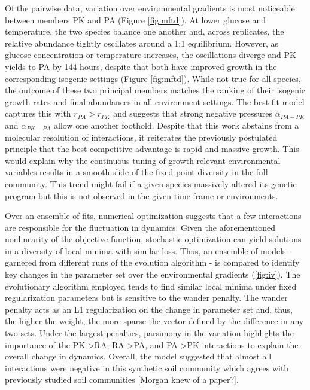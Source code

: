 \documentclass[twocolumn, 10pt]{report}
\begin{document}
{Of the pairwise data, variation over environmental gradients is most noticeable between members PK and PA (Figure \ref{fig:mftd}). At lower glucose and temperature, the two species balance one another and, across replicates, the relative abundance tightly oscillates around a 1:1 equilibrium. However, as glucose concentration or temperature increases, the oscillations diverge and PK yields to PA by 144 hours, despite that both have improved growth in the corresponding isogenic settings (Figure \ref{fig:mftd}). While not true for all species, the outcome of these two principal members matches the ranking of their isogenic growth rates and final abundances in all environment settings. The best-fit model captures this with $r_{PA} > r_{PK}$ and suggests that strong negative pressures $\alpha_{PA-PK}$ and $\alpha_{PK-PA}$ allow one another foothold. Despite that this work abstains from a molecular resolution of interactions, it reiterates the previously postulated principle that the best competitive advantage is rapid and massive growth. This would explain why the continuous tuning of growth-relevant environmental variables results in a smooth slide of the fixed point diversity in the full community. This trend might fail if a given species massively altered its genetic program but this is not observed in the given time frame or environments.

Over an ensemble of fits, numerical optimization suggests that a few interactions are responsible for the fluctuation in dynamics. Given the aforementioned nonlinearity of the objective function, stochastic optimization can yield solutions in a diversity of local minima with similar loss. Thus, an ensemble of models - garnered from different runs of the evolution algorithm - is compared to identify key changes in the parameter set over the environmental gradients (\ref{fig:iv}). The evolutionary algorithm employed tends to find similar local minima under fixed regularization parameters but is sensitive to the wander penalty. The wander penalty acts as an L1 regularization on the change in parameter set and, thus, the higher the weight, the more sparse the vector defined by the difference in any two sets. Under the largest penalties, parsimony in the variation highlights the importance of the PK->RA, RA->PA, and PA->PK interactions to explain the overall change in dynamics. Overall, the model suggested that almost all interactions were negative in this synthetic soil community which agrees with previously studied soil communities [Morgan knew of a paper?].

}
\end{document}
